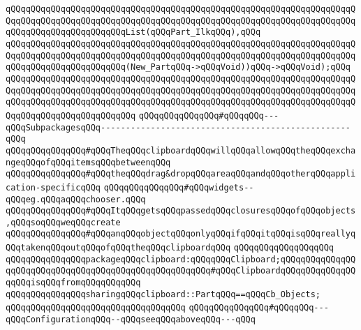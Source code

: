 \verb|qQQqqQQqqQQqqQQqqQQqqQQqqQQqqQQqqQQqqQQqqQQqqQQqqQQqqQQqqQQqqQQqqQQqqQQqqQQqqQQqqQQqqQQqqQQqqQQqqQQqqQQqqQQqqQQqqQQqqQQqqQQqqQQqqQQqqQQqqQQqqQQqqQQqqQQqqQQqqQQqqQQqList(qQQqPart_IlkqQQq),qQQq|\newline
\verb|qQQqqQQqqQQqqQQqqQQqqQQqqQQqqQQqqQQqqQQqqQQqqQQqqQQqqQQqqQQqqQQqqQQqqQQqqQQqqQQqqQQqqQQqqQQqqQQqqQQqqQQqqQQqqQQqqQQqqQQqqQQqqQQqqQQqqQQqqQQqqQQqqQQqqQQqqQQqqQQqqQQq(New_PartqQQq->qQQqVoid))qQQq->qQQqVoid);qQQq|\newline
\verb|qQQqqQQqqQQqqQQqqQQqqQQqqQQqqQQqqQQqqQQqqQQqqQQqqQQqqQQqqQQqqQQqqQQqqQQqqQQqqQQqqQQqqQQqqQQqqQQqqQQqqQQqqQQqqQQqqQQqqQQqqQQqqQQqqQQqqQQqqQQqqQQqqQQqqQQqqQQqqQQqqQQqqQQqqQQqqQQqqQQqqQQqqQQqqQQqqQQqqQQqqQQqqQQqqQQqqQQqqQQqqQQqqQQqqQQqqQQq|\newline
\newline
\verb|qQQqqQQqqQQqqQQq#qQQqqQQq---qQQqSubpackagesqQQq--------------------------------------------------qQQq|\newline
\newline
\newline
\verb|qQQqqQQqqQQqqQQq#qQQqTheqQQqclipboardqQQqwillqQQqallowqQQqtheqQQqexchangeqQQqofqQQqitemsqQQqbetweenqQQq|\newline
\verb|qQQqqQQqqQQqqQQq#qQQqtheqQQqdrag&dropqQQqareaqQQqandqQQqotherqQQqapplication-specificqQQq|\newline
\verb|qQQqqQQqqQQqqQQq#qQQqwidgets--qQQqeg.qQQqaqQQqchooser.qQQq|\newline
\verb|qQQqqQQqqQQqqQQq#qQQqItqQQqgetsqQQqpassedqQQqclosuresqQQqofqQQqobjects,qQQqsoqQQqweqQQqcreate|\newline
\verb|qQQqqQQqqQQqqQQq#qQQqanqQQqobjectqQQqonlyqQQqifqQQqitqQQqisqQQqreallyqQQqtakenqQQqoutqQQqofqQQqtheqQQqclipboardqQQq|\newline
\newline
\verb|qQQqqQQqqQQqqQQqqQQq|\newline
\verb|qQQqqQQqqQQqqQQqpackageqQQqclipboard:qQQqqQQqClipboard;qQQqqQQqqQQqqQQqqQQqqQQqqQQqqQQqqQQqqQQqqQQqqQQqqQQqqQQq#qQQqClipboardqQQqqQQqqQQqqQQqqQQqisqQQqfromqQQqqQQqqQQq|\newline
\verb|qQQqqQQqqQQqqQQqsharingqQQqclipboard::PartqQQq==qQQqCb_Objects;|\newline
\verb|qQQqqQQqqQQqqQQqqQQqqQQqqQQqqQQqqQQq|\newline
\newline
\verb|qQQqqQQqqQQqqQQq#qQQqqQQq---qQQqConfigurationqQQq--qQQqseeqQQqaboveqQQq---qQQq|\newline
